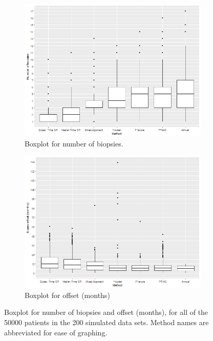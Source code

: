 \begin{figure}[!htb]
    \centering
    \captionsetup{justification=centering}
     \begin{subfigure}[b]{0.45\textwidth}
        \includegraphics[width=\textwidth]{images/sim_study/nbBoxPlot.png}
        \caption{Boxplot for number of biopsies.}
        \label{fig : nbBoxPlot}
    \end{subfigure}
    \begin{subfigure}[b]{0.45\textwidth}
        \includegraphics[width=\textwidth]{images/sim_study/offsetBoxPlot.png}
        \caption{Boxplot for offset (months)}
        \label{fig : offsetBoxPlot}
    \end{subfigure}      
    \caption{Boxplot for number of biopsies and offset (months), for all of the 50000 patients in the 200 simulated data sets. Method names are abbreviated for ease of graphing.}
\end{figure}
